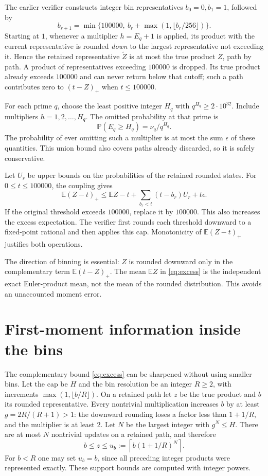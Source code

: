 \documentclass[11pt]{article}
\newcommand{\E}{\mathbb E}
\newcommand{\Pp}{\mathbb P}
\newcommand{\pos}[1]{(#1)_+}
\begin{document}
The earlier verifier constructs integer bin representatives $b_0=0,b_1=1$, followed
by
\[
 b_{r+1}=\min\{100000,\ b_r+\max(1,\lfloor b_r/256\rfloor)\}.
\]
Starting at $1$, whenever a multiplier $h=E_q+1$ is applied, its product
with the current representative is rounded \emph{down} to the largest
representative not exceeding it. Hence the retained representative
$\widetilde Z$ is at most the true product $Z$, path by path. A product of
representatives exceeding $100000$ is dropped. Its true product already
exceeds $100000$ and can never return below that cutoff; such a path
contributes zero to $(t-Z)_+$ when $t\leq100000$.

For each prime $q$, choose the least positive integer $H_q$ with
$q^{H_q}\geq2\cdot10^{32}$. Include multipliers $h=1,2,\ldots,H_q$.
The omitted probability at that prime is
\[
 \Pp(E_q\geq H_q)=\nu_q/q^{H_q}.
\]
The probability of ever omitting such a multiplier is at most the sum
$\epsilon$ of these quantities. This union bound also covers paths already
discarded, so it is safely conservative.

Let $U_r$ be upper bounds on the probabilities of the retained rounded
states. For $0\leq t\leq100000$, the coupling gives
\begin{equation}\label{eq:excess}
 \E\pos{Z-t}\leq
 \E Z-t+\sum_{b_r<t}(t-b_r)U_r+t\epsilon.
\end{equation}
If the original threshold exceeds $100000$, replace it by $100000$.
This also increases the excess expectation. The verifier first rounds each
threshold downward to a fixed-point rational and then applies this cap.
Monotonicity of $\E(Z-t)_+$ justifies both operations.

The direction of binning is essential: $Z$ is rounded downward only in the
complementary term $\E(t-Z)_+$. The mean $\E Z$ in \eqref{eq:excess}
is the independent exact Euler-product mean, not the mean of the rounded
distribution. This avoids an unaccounted moment error.

\section{First-moment information inside the bins}\label{sec:binmean}
The complementary bound \eqref{eq:excess} can be sharpened without using
smaller bins. Let the cap be $H$ and the bin resolution be an integer
$R\geq2$, with increments $\max(1,\lfloor b/R\rfloor)$. On a retained
path let $z$ be the true product and $b$ its rounded representative.
Every nontrivial multiplication increases $b$ by at least
$g=2R/(R+1)>1$: the downward rounding loses a factor less than $1+1/R$,
and the multiplier is at least $2$. Let $N$ be the largest integer with
$g^N\leq H$. There are at most $N$ nontrivial updates on a retained path,
and therefore
\[
 b\leq z\leq u_b:=\left\lceil b(1+1/R)^N\right\rceil.
\]
For $b<R$ one may set $u_b=b$, since all preceding integer products were
represented exactly. These support bounds are computed with integer powers.
\end{document}
